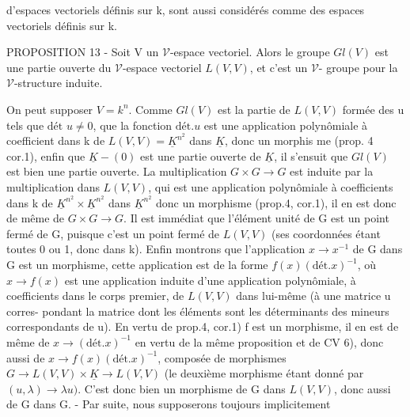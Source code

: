 \newpage



d'espaces vectoriels définis sur k, sont aussi considérés comme des
espaces vectoriels définis sur k.

PROPOSITION 13 - Soit V un $\mathcal{V}$-espace vectoriel. Alors le groupe $Gl(V)$
est une partie ouverte du $\mathcal{V}$-espace vectoriel $L(V,V)$, et c'est un $\mathcal{V}$-
groupe pour la $\mathcal{V}$-structure induite.

On peut supposer $V=k^n$. Comme $Gl(V)$ est la partie de $L(V,V)$ formée
des u tels que $\text{dét } u \neq 0$, que la fonction $\text{dét.}u$ est une application
polynômiale à coefficient dans k de $L(V,V) = \underline{K}^{n^2}$ dans $\underline{K}$, donc un morphis
me (prop. 4 cor.1), enfin que $\underline{K}-(0)$ est une partie ouverte de $\underline{K}$, il
s'ensuit que $Gl(V)$ est bien une partie ouverte. La multiplication
$G \times G \rightarrow G$ est induite par la multiplication dans $L(V,V)$, qui est une
application polynômiale à coefficients dans k de $\underline{K}^{n^2} \times \underline{K}^{n^2}$ dans $\underline{K}^{n^2}$ donc un morphisme
(prop.4, cor.1), il en est donc de même de $G \times G \rightarrow G$. Il est immédiat
que l'élément unité de G est un point fermé de G, puisque c'est un point
fermé de $L(V,V)$ (ses coordonnées étant toutes 0 ou 1, donc dans k).
Enfin montrons que l'application $x \rightarrow x^{-1}$ de G dans G est un morphisme,
cette application est de la forme $f(x)(\text{dét.}x)^{-1}$, où $x \rightarrow f(x)$ est une
application induite d'une application polynômiale, à coefficients
dans le corps premier, de $L(V,V)$ dans lui-même (à une matrice u corres-
pondant la matrice dont les éléments sont les déterminants des mineurs
correspondants de u). En vertu de prop.4, cor.1) f est un morphisme,
il en est de même de $x \rightarrow (\text{dét.}x)^{-1}$ en vertu de la même proposition et
de CV 6), donc aussi de $x \rightarrow f(x)(\text{dét.}x)^{-1}$, composée de morphismes
$G \rightarrow L(V,V) \times \underline{K} \rightarrow L(V,V)$ (le deuxième morphisme étant donné par
$(u, \lambda) \rightarrow \lambda u)$. C'est donc bien un morphisme de G dans $L(V,V)$, donc
aussi de G dans G. - Par suite, nous supposerons toujours implicitement

\newpage



